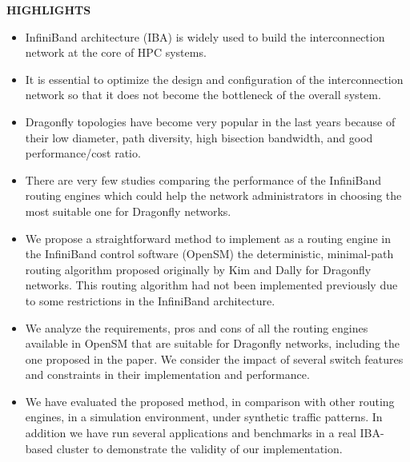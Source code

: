 \documentclass[a4paper,10pt]{letter}
\begin{document}
\begin{center}
    \textbf{HIGHLIGHTS}
\end{center}


\begin{itemize}
    \item InfiniBand architecture (IBA) is widely used to build the interconnection network at the core of HPC systems.

    \item It is essential to optimize the design and configuration of the interconnection network so that it does not become the bottleneck of the overall system.

    \item Dragonfly topologies have become very popular in the last years because of their low diameter, path diversity, high bisection bandwidth, and good performance/cost ratio.

    \item There are very few studies comparing the performance of the InfiniBand routing engines which could help the network administrators in choosing the most suitable one for Dragonfly networks.

    \item We propose a straightforward method to implement as a routing engine in the InfiniBand control software (OpenSM) the deterministic, minimal-path routing algorithm proposed originally by Kim and Dally for Dragonfly networks. This routing algorithm had not been implemented previously due to some restrictions in the InfiniBand architecture.

    \item We analyze the requirements, pros and cons of all the routing engines available in OpenSM that are suitable for Dragonfly networks, including the one proposed in the paper. We consider the impact of several switch features and constraints in their implementation and performance.

    \item We have evaluated the proposed method, in comparison with other routing engines, in a simulation environment, under synthetic traffic patterns. In addition we have run several applications and benchmarks in a real IBA-based cluster to demonstrate the validity of our implementation.
\end{itemize}
\end{document}
